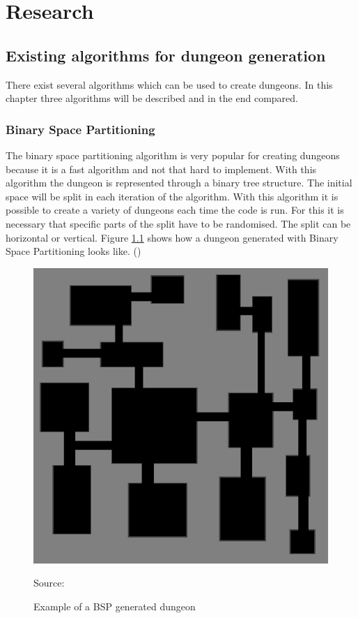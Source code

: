 \documentclass[a4paper,11pt,oneside]{scrreprt}
\begin{document}
\chapter{Research}
\label{chapter:research}

\section{Existing algorithms for dungeon generation}
\label{section:existing-algorithms}
There exist several algorithms which can be used to create dungeons. In this chapter three algorithms will be described and in the end compared. 

\subsection{Binary Space Partitioning}
\label{subsection:binary-space-partitioning}
The binary space partitioning algorithm is very popular for creating dungeons because it is a fast algorithm and not that hard to implement. With this algorithm the dungeon is represented through a binary tree structure. The initial space will be split in each iteration of the algorithm. With this algorithm it is possible to create a variety of dungeons each time the code is run. For this it is necessary that specific parts of the split have to be randomised. The split can be horizontal or vertical. Figure \ref{fig:bsp_example} shows how a dungeon generated with Binary Space Partitioning looks like. (\cite[][]{williams_investigation_nodate})

\begin{figure}[ht]
	\centering
	\includegraphics[scale=0.6]{images/bsp_example.png} 
	\caption{Example of a BSP generated dungeon}
	Source: \cite[][]{williams_investigation_nodate}
	\label{fig:bsp_example}
\end{figure}
\end{document}

